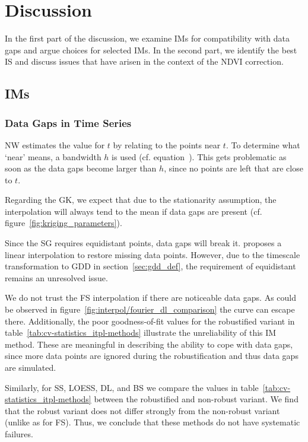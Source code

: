 \chapter{Discussion}\label{sec:discussion}
    In the first part of the discussion, we examine IMs for compatibility with data gaps and argue choices for selected IMs. In the second part, we identify the best IS and discuss issues that have arisen in the context of the NDVI correction.


\section{{{IM}}s}{ \label{sec:discussion_itpl}
    \subsection{Data Gaps in Time Series}\label{sec:discussion_itpl_data_gaps}{
        NW estimates the value for $t$ by relating to the points near $t$. To determine what `near' means, a bandwidth $h$ is used (cf. equation~). This gets problematic as soon as the data gaps become larger than $h$, since no points are left that are close to $t$. 

        Regarding the GK, we expect that due to the stationarity assumption, the interpolation will always tend to the mean if data gaps are present (cf. figure~\ref{fig:kriging_parameters}). 

        Since the SG requires equidistant points, data gaps will break it. \cite{chenSimpleMethodReconstructing2004a} proposes a linear interpolation to restore missing data points. However, due to the timescale transformation to GDD in section~\ref{sec:gdd_def}, the requirement of equidistant remains an unresolved issue.

        We do not trust the FS interpolation if there are noticeable data gaps. As could be observed in figure~\ref{fig:interpol/fourier_dl_comparison} the curve can escape there. Additionally, the poor goodness-of-fit values for the robustified variant in table~\ref{tab:cv-statistics_itpl-methods} illustrate the unreliability of this IM method.
        These are meaningful in describing the ability to cope with data gaps, since more data points are ignored during the robustification and thus data gaps are simulated. 

        Similarly, for SS, LOESS, DL, and BS we compare the values in table~\ref{tab:cv-statistics_itpl-methods} between the robustified and non-robust variant. We find that the robust variant does not differ strongly from the non-robust variant (unlike as for FS). Thus, we conclude that these methods do not have systematic failures.

}}
